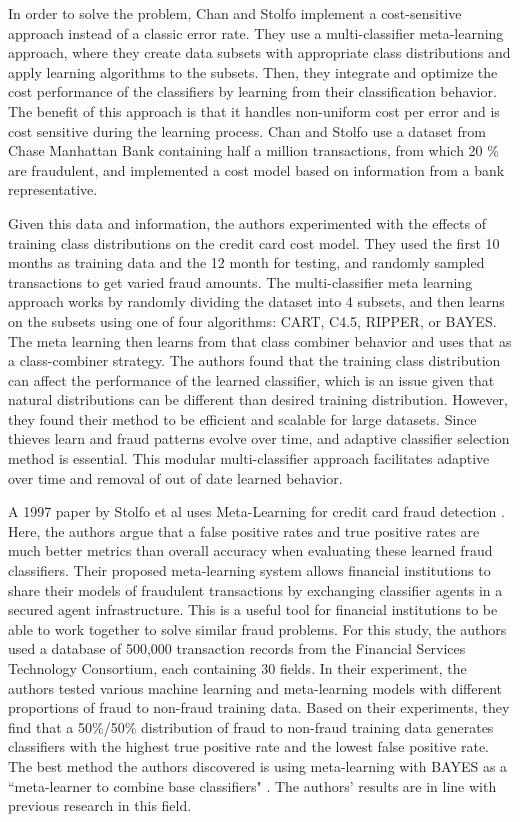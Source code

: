\documentclass[midd]{thesis}
\begin{document}
In order to solve the problem, Chan and Stolfo implement a cost-sensitive approach instead of a classic error rate. They use a multi-classifier meta-learning approach, where they create data subsets with appropriate class distributions and apply learning algorithms to the subsets. Then, they integrate and optimize the cost performance of the classifiers by learning from their classification behavior. The benefit of this approach is that it handles non-uniform cost per error and is cost sensitive during the learning process. Chan and Stolfo use a dataset from Chase Manhattan Bank containing half a million transactions, from which 20 \% are fraudulent, and implemented a cost model based on information from a bank representative. 

Given this data and information, the authors experimented with the effects of training class distributions on the credit card cost model. They used the first 10 months as training data and the 12 month for testing, and randomly sampled transactions to get varied fraud amounts. The multi-classifier meta learning approach works by randomly dividing the dataset into 4 subsets, and then learns on the subsets using one of four algorithms: CART, C4.5, RIPPER, or BAYES. The meta learning then learns from that class combiner behavior and uses that as a class-combiner strategy. The authors found that the training class distribution can affect the performance of the learned classifier, which is an issue given that natural distributions can be different than desired training distribution. However, they found their method to be efficient and scalable for large datasets. Since thieves learn and fraud patterns evolve over time, and adaptive classifier selection method is essential. This modular multi-classifier approach facilitates adaptive over time and removal of out of date learned behavior.

A 1997 paper by Stolfo et al uses Meta-Learning for credit card fraud detection \cite{Stolfo1997}. Here, the authors argue that a false positive rates and true positive rates are much better metrics than overall accuracy when evaluating these learned fraud classifiers. Their proposed meta-learning system allows financial institutions to share their models of fraudulent transactions by exchanging classifier agents in a secured agent infrastructure. This is a useful tool for financial institutions to be able to work together to solve similar fraud problems. For this study, the authors used a database of 500,000 transaction records from the Financial Services Technology Consortium, each containing 30 fields. In their experiment, the authors tested various machine learning and meta-learning models with different proportions of fraud to non-fraud training data. Based on their experiments, they find that a 50\%/50\% distribution of fraud to non-fraud training data generates classifiers with the highest true positive rate and the lowest false positive rate. The best method the authors discovered is using meta-learning with BAYES as a ``meta-learner to combine base classifiers" \cite{Stolfo1997}. The authors' results are in line with previous research in this field. 
\end{document}
